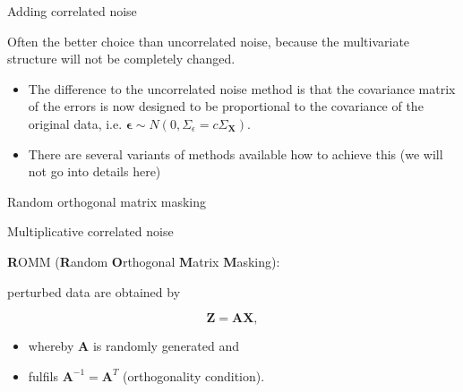\documentclass[ignorenonframetext,]{beamer}
\providecommand{\tightlist}{%
  \setlength{\itemsep}{0pt}\setlength{\parskip}{0pt}}
\begin{document}
\begin{frame}{Adding correlated noise}
\protect\hypertarget{adding-correlated-noise}{}

Often the better choice than uncorrelated noise, because the
multivariate structure will not be completely changed.

\begin{itemize}
\item
  The difference to the uncorrelated noise method is that the covariance
  matrix of the errors is now designed to be proportional to the
  covariance of the original data, i.e.
  \(\mathbf{\epsilon} \sim N(0,\Sigma_{\epsilon}=c\Sigma_{\mathbf{X}})\).
\item
  There are several variants of methods available how to achieve this
  (we will not go into details here)
\end{itemize}

\end{frame}

\begin{frame}{Random orthogonal matrix masking}
\protect\hypertarget{random-orthogonal-matrix-masking}{}

Multiplicative correlated noise

\textbf{R}OMM (\textbf{R}andom \textbf{O}rthogonal \textbf{M}atrix
\textbf{M}asking):

perturbed data are obtained by

\[\mathbf{Z} = \mathbf{A} \mathbf{X} ,\]

\begin{itemize}
\tightlist
\item
  whereby \(\mathbf{A}\) is randomly generated and
\item
  fulfils \(\mathbf{A}^{-1} = \mathbf{A}^T\) (orthogonality condition).
\end{itemize}

\end{frame}
\end{document}
